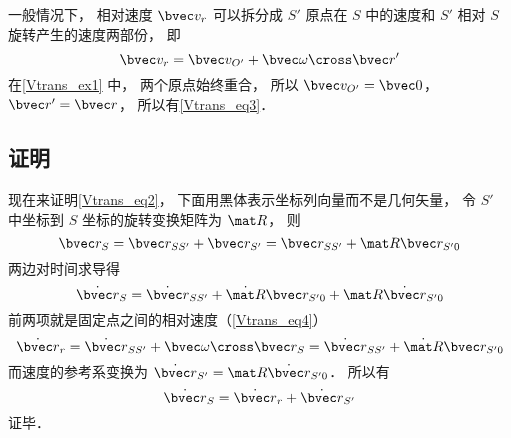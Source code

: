 一般情况下， 相对速度 $\bvec v_r$ 可以拆分成 $S'$ 原点在 $S$ 中的速度和 $S'$ 相对 $S$ 旋转产生的速度两部份， 即
\begin{equation}\label{Vtrans_eq4}
\bvec v_r = \bvec v_{O'} + \bvec \omega \cross \bvec r'
\end{equation}
在\autoref{Vtrans_ex1} 中， 两个原点始终重合， 所以 $\bvec v_{O'} = \bvec 0$， $\bvec r' = \bvec r$， 所以有\autoref{Vtrans_eq3}．

\subsection{证明}
现在来证明\autoref{Vtrans_eq2}， 下面用黑体表示坐标列向量而不是几何矢量， 令 $S'$ 中坐标到 $S$ 坐标的旋转变换矩阵为 $\mat R$， 则
\begin{equation}
\bvec r_S = \bvec r_{SS'} + \bvec r_{S'} = \bvec r_{SS'} + \mat R\bvec r_{S'0}
\end{equation}
两边对时间求导得
\begin{equation}
\dot{\bvec r}_S = \dot{\bvec r}_{SS'} + \dot{\mat R}\bvec r_{S'0} + \mat R \dot{\bvec r}_{S'0}
\end{equation}
前两项就是固定点之间的相对速度（\autoref{Vtrans_eq4}）
\begin{equation}
\dot{\bvec r}_r = \dot{\bvec r}_{SS'} + \bvec \omega \cross \bvec r_S = \dot{\bvec r}_{SS'} + \dot{\mat R}\bvec r_{S'0}
\end{equation}
而速度的参考系变换为 $\dot{\bvec r}_{S'} = \mat R \dot{\bvec r}_{S'0}$． 所以有
\begin{equation}
\dot{\bvec r}_S = \dot{\bvec r}_r + \dot{\bvec r}_{S'}
\end{equation}
证毕．

